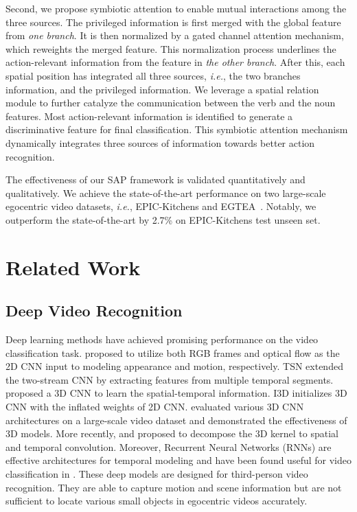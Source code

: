 \documentclass[letterpaper]{article} \usepackage{aaai20}  \usepackage{times}  \usepackage{helvet} \usepackage{courier}  \usepackage[hyphens]{url}  \usepackage{graphicx} \urlstyle{rm} \def\UrlFont{\rm}  \usepackage{graphicx}  \frenchspacing  \setlength{\pdfpagewidth}{8.5in}  \setlength{\pdfpageheight}{11in}  \usepackage{amsfonts,amssymb}
\def\ie{\emph{i.e.}}
\begin{document}
Second, we propose symbiotic attention to enable mutual interactions among the three sources. The privileged information is first merged with the global feature from \textit{one branch}. It is then normalized by a gated channel attention mechanism, which reweights the merged feature. This normalization process underlines the action-relevant information from the feature in \textit{the other branch}. After this, each spatial position has integrated all three sources, \ie, the two branches information, and the privileged information.
We leverage a spatial relation module to further catalyze the communication between the verb and the noun features.
Most action-relevant information is identified to generate a discriminative feature for final classification.
This symbiotic attention mechanism dynamically integrates three sources of information towards better action recognition. 

The effectiveness of our SAP framework is validated quantitatively and qualitatively. We achieve the state-of-the-art performance on two large-scale egocentric video datasets, \ie, EPIC-Kitchens and EGTEA~\cite{li2018eye}. Notably, we outperform the state-of-the-art \cite{Wu2018LongTermFB} by
2.7\% on EPIC-Kitchens test unseen set.

\section{Related Work}
\subsection{Deep Video Recognition}
Deep learning methods have achieved promising performance on the video classification task. \cite{simonyan2014two}  proposed to utilize both RGB frames and optical flow as the 2D CNN input to modeling appearance and motion, respectively. TSN \cite{TSN2016ECCV} extended the two-stream CNN by extracting features from multiple temporal segments.  \cite{tran2015learning} proposed a 3D CNN to learn the spatial-temporal information. I3D  initializes 3D CNN with the inflated weights of 2D CNN.   \cite{Hara2018CanS3} evaluated various 3D CNN architectures on a large-scale video dataset and demonstrated the effectiveness of 3D models. More recently, \cite{xie2018rethinking} and  \cite{tran2018closer}  proposed to decompose the 3D kernel to spatial and temporal convolution. 
Moreover, Recurrent Neural Networks (RNNs) are effective architectures for temporal modeling and have been found useful for video classification in \cite{abu2016youtube,Zhu_2017_CVPR}. 
These deep models are designed for third-person video recognition. They are able to capture motion and scene information but are not sufficient to locate various small objects in egocentric videos accurately.  
\end{document}
